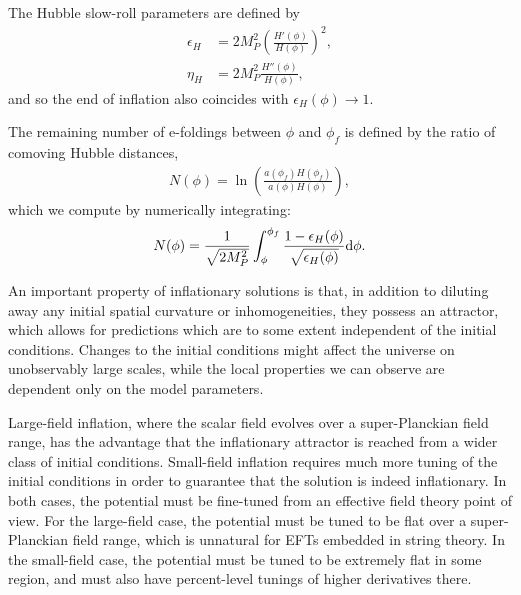\documentclass[aps,amsfonts,amsmath,prd,preprint,nofootinbib,superscriptaddress]{revtex4}
\newcommand{\MMp}{{M_P^2}}
\newcommand{\rmd}{{\rm d}}
\begin{document}
\begin{appendix}
The Hubble slow-roll parameters are defined by
\begin{align}
\epsilon_H &= 2\MMp \left(\frac{H'(\phi)}{H(\phi)}\right)^2,\\
\eta_H &= 2\MMp \frac{H''(\phi)}{H(\phi)},
\end{align}
and so the end of inflation also coincides with ${\epsilon_H(\phi) \to 1}$.  

The remaining number of e-foldings between $\phi$ and $\phi_f$ is defined by the ratio of comoving Hubble distances, 
\begin{align}
N(\phi) = \ln\left(\frac{a(\phi_f) H(\phi_f)}{a(\phi) H(\phi)}\right),
\end{align}
which we compute by numerically integrating:
\begin{align}
N(\phi) = \frac{1}{\sqrt{2\MMp}}\int_{\phi}^{\phi_f} \frac{1-\epsilon_H(\phi)}{\sqrt{\epsilon_H(\phi)}}\rmd \phi .
\end{align}



















An important property of inflationary solutions is that, in addition to diluting away any initial spatial curvature or inhomogeneities, 
they possess an attractor, which allows for predictions which are to some extent independent of the initial conditions.  
Changes to the initial conditions might affect the universe on unobservably large scales, while the local properties we can observe 
are dependent only on the model parameters.

Large-field inflation, where the scalar field evolves over a super-Planckian field range, has the advantage that the inflationary attractor 
is reached from a wider class of initial conditions.  Small-field inflation requires much more tuning of the initial conditions in order to 
guarantee that the solution is indeed inflationary.  In both cases, the potential must be fine-tuned from an effective field theory point of view.  
For the large-field case, the potential must be tuned to be flat over a super-Planckian field range, which is unnatural \cite{banks,swampland} for 
EFTs embedded in string theory.  In the small-field case, the potential must be tuned to be extremely flat in some region, 
and must also have percent-level tunings of higher derivatives there.



\end{appendix}
\end{document}
